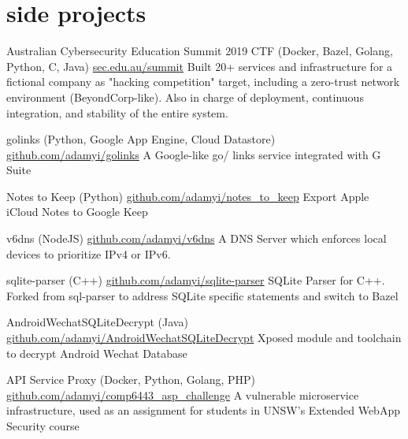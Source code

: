 \documentclass[hidelinks__VERSION__]{adamyi-cv}
\begin{document}

\section{side projects}

\begin{entrylist}


\entry
{Australian Cybersecurity Education Summit 2019 CTF (Docker, Bazel, Golang, Python, C, Java)}
{\href{https://sec.edu.au/summit}{sec.edu.au/summit}}
{Built 20+ services and infrastructure for a fictional company as "hacking competition" target, including a zero-trust network environment (BeyondCorp-like). Also in charge of deployment, continuous integration, and stability of the entire system.}


\entry
{golinks (Python, Google App Engine, Cloud Datastore)}
{\href{https://github.com/adamyi/golinks}{github.com/adamyi/golinks}}
{A Google-like go/ links service integrated with G Suite}


\entry
{Notes to Keep (Python)}
{\href{https://github.com/adamyi/notes_to_keep}{github.com/adamyi/notes\_to\_keep}}
{Export Apple iCloud Notes to Google Keep}


\entry
{v6dns (NodeJS)}
{\href{https://github.com/adamyi/v6dns}{github.com/adamyi/v6dns}}
{A DNS Server which enforces local devices to prioritize IPv4 or IPv6.}


\entry
{sqlite-parser (C++)}
{\href{https://github.com/adamyi/sqlite-parser}{github.com/adamyi/sqlite-parser}}
{SQLite Parser for C++. Forked from sql-parser to address SQLite specific statements and switch to Bazel}


\entry
{AndroidWechatSQLiteDecrypt (Java)}
{\href{https://github.com/adamyi/AndroidWechatSQLiteDecrypt}{github.com/adamyi/AndroidWechatSQLiteDecrypt}}
{Xposed module and toolchain to decrypt Android Wechat Database}


\entry
{API Service Proxy (Docker, Python, Golang, PHP)}
{\href{https://github.com/adamyi/comp6443_asp_challenge}{github.com/adamyi/comp6443\_asp\_challenge}}
{A vulnerable microservice infrastructure, used as an assignment for students in UNSW's Extended WebApp Security course}


\end{entrylist}
\end{document}
